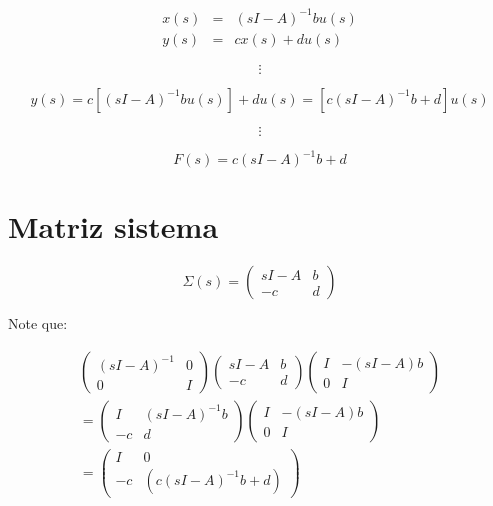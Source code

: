\begin{eqnarray}
x(s) & = & (s I - A)^{-1} b u(s) \nonumber \\
y(s) & = & c x(s) + d u(s) \nonumber
\end{eqnarray}

\begin{equation}
\vdots \nonumber
\end{equation}

\begin{equation}
y(s) = c[(s I - A)^{-1} b u(s)] + d u(s) = [c(s I - A)^{-1} b + d] u(s) \nonumber
\end{equation}

\begin{equation}
\vdots \nonumber
\end{equation}

\begin{equation}
F(s) = c(s I - A)^{-1} b + d
\end{equation}

\section{Matriz sistema}

\begin{equation}
\Sigma(s) =
\begin{pmatrix}
sI - A & b \\
-c & d
\end{pmatrix}
\end{equation}

Note que:

\begin{multline}
\begin{pmatrix}
(sI - A)^{-1} & 0 \\
0 & I
\end{pmatrix}
\begin{pmatrix}
sI - A & b \\
-c & d
\end{pmatrix}
\begin{pmatrix}
I & -(sI - A)b \\
0 & I
\end{pmatrix}
\\
=
\begin{pmatrix}
I & (sI - A)^{-1} b \\
-c & d
\end{pmatrix}
\begin{pmatrix}
I & -(sI - A)b \\
0 & I
\end{pmatrix}
\\
=
\begin{pmatrix}
I & 0 \\
-c & (c(sI - A)^{-1} b + d)
\end{pmatrix}
\nonumber
\end{multline}

